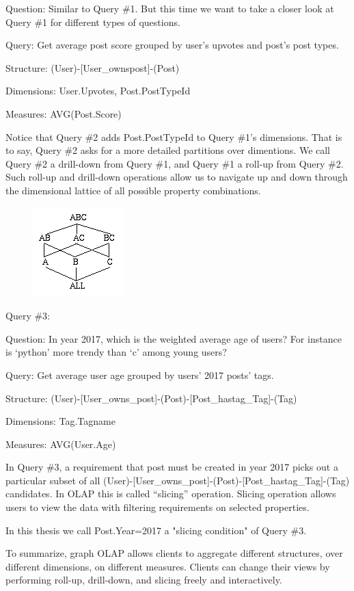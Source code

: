 Question: 	Similar to Query \#1. But this time we want to take a closer look at Query \#1 for different types of questions. 

Query: 		Get average post score grouped by user’s upvotes and post’s post types. 

Structure:	(User)-[User\_ownspost]-(Post)

Dimensions:	{User.Upvotes, Post.PostTypeId}

Measures:	{AVG(Post.Score)}
 
Notice that Query \#2 adds Post.PostTypeId to Query \#1’s dimensions. That is to say, Query \#2 asks for a more detailed partitions over dimentions. We call Query \#2 a drill-down from Query \#1, and  Query \#1 a roll-up from Query \#2. Such roll-up and drill-down operations allow us to navigate up and down through the dimensional lattice of all possible property combinations. 

\begin {figure}[H]
\centering
\includegraphics[scale=1]{pic/22.png}
\end{figure}

Query \#3:

Question: 	In year 2017, which is the weighted average age of users? For instance is ‘python’ more trendy than ‘c’ among young users?
 
Query: 		Get average user age grouped by users’ 2017 posts’ tags. 

Structure:	(User)-[User\_owns\_post]-(Post)-[Post\_hastag\_Tag]-(Tag)

Dimensions:	{Tag.Tagname}

Measures:	{AVG(User.Age)}
 
In Query \#3, a requirement that post must be created in year 2017 picks out a particular subset of  all (User)-[User\_owns\_post]-(Post)-[Post\_hastag\_Tag]-(Tag) candidates. In OLAP this is called “slicing” operation. Slicing operation allows users to view the data with filtering requirements on selected properties. 
 
In this thesis we call {Post.Year=2017} a "slicing condition" of Query \#3.
 
To summarize, graph OLAP allows clients to aggregate different structures, over different dimensions, on different measures. Clients can change their views by performing roll-up, drill-down, and slicing freely and interactively.



